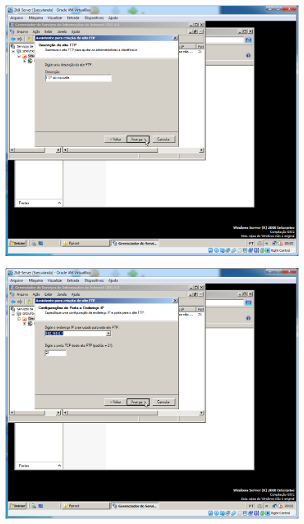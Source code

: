 \documentclass[10pt]{article}
\begin{document}
\begin{figure}[H]
    \centering
    \caption{}
    \label{fig:54111}
    \includegraphics[width=\linewidth]{images/windows_server/ftp/019.png}
\end{figure}
\begin{figure}[H]
    \centering
    \caption{}
    \label{fig:54112}
    \includegraphics[width=\linewidth]{images/windows_server/ftp/020.png}
\end{figure}
\end{document}
